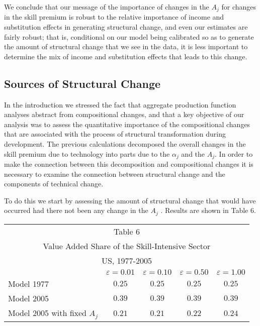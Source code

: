 \documentclass[12pt,english]{article}
\begin{document}
{\normalsize We conclude that our message of the importance of changes in
the $A_{j}$ for changes in the skill premium is robust to the relative
importance of income and substitution effects in generating structural
change, and even our estimates are fairly robust; that is, conditional on our model being calibrated so as to generate
the amount of structural change that we see in the data, it is less important to determine the mix of income and substitution effects that leads to this change. }

\subsection{Sources of Structural Change}

{\normalsize In the introduction we stressed the fact that aggregate
production function analyses abstract from compositional changes, and that a
key objective of our analysis was to assess the quantitative importance of
the compositional changes that are associated with the process of structural
transformation during development. The previous calculations decomposed the
overall changes in the skill premium due to technology into parts due to the 
$\alpha _{j}$ and the $A_{j}$. In order to make the connection between this
decomposition and compositional changes it is necessary to examine the
connection between structural change and the components of technical change. 
}

{\normalsize To do this we start by assessing the amount of structural
change that would have occurred had there not been any change in the $A_{j}$%
. Results are shown in Table 6. }

\begin{center}
{\normalsize {\small 
\begin{tabular}{lcccc}
\multicolumn{5}{c}{Table 6} \\ 
\multicolumn{5}{c}{Value Added Share of the Skill-Intensive Sector} \\ 
\multicolumn{5}{c}{US, 1977-2005} \\ \hline
& $\varepsilon =0.01$ & $\varepsilon =0.10$ & $\varepsilon =0.50$ & $%
\varepsilon =1.00$ \\ \hline
Model 1977 & $0.25$ & $0.25$ & $0.25$ & $0.25$ \\ 
Model 2005 & $0.39$ & $0.39$ & $0.39$ & $0.39$ \\ 
Model 2005 with fixed $A_{j}$ & $0.21$ & $0.21$ & $0.22$ & $0.24$ \\ \hline
\end{tabular}
} }
\end{center}
\end{document}
